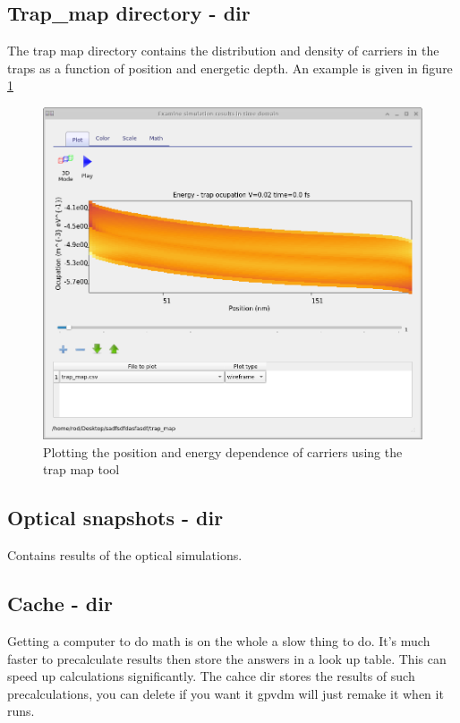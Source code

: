 \subsection{Trap\_map directory - dir}
The trap map directory contains the distribution and density of carriers in the traps as a function of position and energetic depth. An example is given in figure \ref{fig:trapmap}
\label{sec:trapmap}


\begin{figure}[H]
\centering
\includegraphics[width=\textwidth,height=0.7\textwidth]{./images/trapmap.png}
\caption{Plotting the position and energy dependence of carriers using the trap map tool}
\label{fig:trapmap}
\end{figure}

\subsection{Optical snapshots - dir}
\label{sec:snapshotsoptical}
Contains results of the optical simulations.

\subsection{Cache - dir}
\label{sec:cache}
Getting a computer to do math is on the whole a slow thing to do. It's much faster to precalculate results then store the answers in a look up table.  This can speed up calculations significantly.  The cahce dir stores the results of such precalculations, you can delete if you want it gpvdm will just remake it when it runs.

